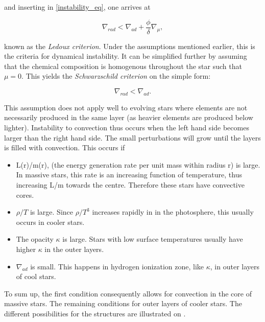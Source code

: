 \noindent and inserting in \eqref{instability_eq}, one arrives at

\begin{equation}
\label{stability2}
    \nabla_{rad} < \nabla_{ad} + \frac{\phi}{\delta} \nabla_\mu,
\end{equation}

known as the \textit{Ledoux criterion}. Under the assumptions mentioned earlier, this is the criteria for dynamical instability. It can be simplified further by assuming that the chemical composition is homogenous throughout the star such that $\mu = 0$. This yields the \textit{Schwarzschild criterion} on the simple form:

\begin{equation}
    \nabla_{rad} < \nabla_{ad}.
\end{equation}

\noindent This assumption does not apply well to evolving stars where elements are not necessarily produced in  the same layer (as heavier elements are produced below lighter). 
Instability to convection thus occurs when the left hand side becomes larger than the right hand side. The small perturbations will grow until the layers is filled with convection. This occurs if

\begin{itemize}
    \item L(r)/m(r), (the energy generation rate per unit mass within radius r) is large. In massive stars, this rate is an increasing function of temperature, thus increasing L/m towards the centre. Therefore these stars have convective cores.
    \item $\rho/T$ is large. Since $\rho/T^3$ increases rapidly in in the photosphere, this usually occurs in cooler stars. 
    \item The opacity $\kappa$ is large. Stars with low surface temperatures usually have higher $\kappa$ in the outer layers. 
    \item $\nabla_{ad}$ is small. This happens in hydrogen ionization zone, like $\kappa$, in outer layers of cool stars.
\end{itemize}

To sum up, the first condition consequently allows for convection in the core of massive stars. The remaining conditions for outer layers of cooler stars. The different possibilities for the structures are illustrated on . 

